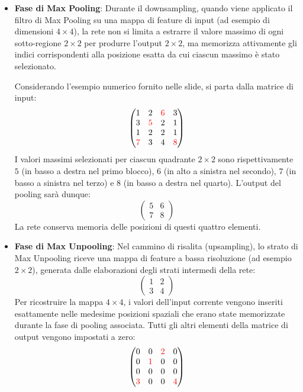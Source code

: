 ﻿\documentclass[11pt, a4paper]{article}
\begin{document}
\begin{itemize}[noitemsep]
    \item \textbf{Fase di Max Pooling}: Durante il downsampling, quando viene applicato il filtro di Max Pooling su una mappa di feature di input (ad esempio di dimensioni $4 \times 4$), la rete non si limita a estrarre il valore massimo di ogni sotto-regione $2 \times 2$ per produrre l'output $2 \times 2$, ma memorizza attivamente gli indici corrispondenti alla posizione esatta da cui ciascun massimo è stato selezionato.

    Considerando l'esempio numerico fornito nelle slide, si parta dalla matrice di input:
    \[
    \begin{pmatrix}
    1 & 2 & \textcolor{red}{6} & 3 \\
    3 & \textcolor{red}{5} & 2 & 1 \\
    1 & 2 & 2 & 1 \\
    \textcolor{red}{7} & 3 & 4 & \textcolor{red}{8}
    \end{pmatrix}
    \]
    I valori massimi selezionati per ciascun quadrante $2 \times 2$ sono rispettivamente $5$ (in basso a destra nel primo blocco), $6$ (in alto a sinistra nel secondo), $7$ (in basso a sinistra nel terzo) e $8$ (in basso a destra nel quarto). L'output del pooling sarà dunque:
    \[
    \begin{pmatrix}
    5 & 6 \\
    7 & 8
    \end{pmatrix}
    \]
    La rete conserva memoria delle posizioni di questi quattro elementi.

    \item \textbf{Fase di Max Unpooling}: Nel cammino di risalita (upsampling), lo strato di Max Unpooling riceve una mappa di feature a bassa risoluzione (ad esempio $2 \times 2$), generata dalle elaborazioni degli strati intermedi della rete:
    \[
    \begin{pmatrix}
    1 & 2 \\
    3 & 4
    \end{pmatrix}
    \]
    Per ricostruire la mappa $4 \times 4$, i valori dell'input corrente vengono inseriti esattamente nelle medesime posizioni spaziali che erano state memorizzate durante la fase di pooling associata. Tutti gli altri elementi della matrice di output vengono impostati a zero:
    \[
    \begin{pmatrix}
    0 & 0 & \textcolor{red}{2} & 0 \\
    0 & \textcolor{red}{1} & 0 & 0 \\
    0 & 0 & 0 & 0 \\
    \textcolor{red}{3} & 0 & 0 & \textcolor{red}{4}
    \end{pmatrix}
    \]
\end{itemize}
\end{document}
